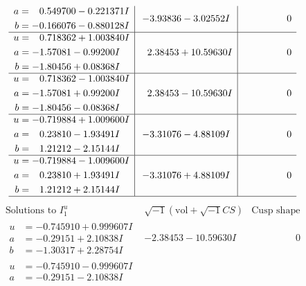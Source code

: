 \documentclass[1p]{elsarticle_modified}
\theoremstyle{definition}
\newcommand{\I}{\sqrt{-1}}
\begin{document}
$$\begin{array}{c|c|c}
\begin{aligned}
a &= \phantom{-}0.549700 - 0.221371 I \\
b &= -0.166076 - 0.880128 I\end{aligned}
 & -3.93836 - 3.02552 I & \phantom{-0.000000 } 0 \\ \hline\begin{aligned}
u &= \phantom{-}0.718362 + 1.003840 I \\
a &= -1.57081 - 0.99200 I \\
b &= -1.80456 + 0.08368 I\end{aligned}
 & \phantom{-}2.38453 + 10.59630 I & \phantom{-0.000000 } 0 \\ \hline\begin{aligned}
u &= \phantom{-}0.718362 - 1.003840 I \\
a &= -1.57081 + 0.99200 I \\
b &= -1.80456 - 0.08368 I\end{aligned}
 & \phantom{-}2.38453 - 10.59630 I & \phantom{-0.000000 } 0 \\ \hline\begin{aligned}
u &= -0.719884 + 1.009600 I \\
a &= \phantom{-}0.23810 - 1.93491 I \\
b &= \phantom{-}1.21212 - 2.15144 I\end{aligned}
 & -3.31076 - 4.88109 I & \phantom{-0.000000 } 0 \\ \hline\begin{aligned}
u &= -0.719884 - 1.009600 I \\
a &= \phantom{-}0.23810 + 1.93491 I \\
b &= \phantom{-}1.21212 + 2.15144 I\end{aligned}
 & -3.31076 + 4.88109 I & \phantom{-0.000000 } 0\\
 \hline 
 \end{array}$$\newpage$$\begin{array}{c|c|c}  
\text{Solutions to }I^u_{1}& \I (\text{vol} + \sqrt{-1}CS) & \text{Cusp shape}\\
 \hline 
\begin{aligned}
u &= -0.745910 + 0.999607 I \\
a &= -0.29151 + 2.10838 I \\
b &= -1.30317 + 2.28754 I\end{aligned}
 & -2.38453 - 10.59630 I & \phantom{-0.000000 } 0 \\ \hline\begin{aligned}
u &= -0.745910 - 0.999607 I \\
a &= -0.29151 - 2.10838 I \\

\end{aligned}
\end{array}$$
\end{document}
